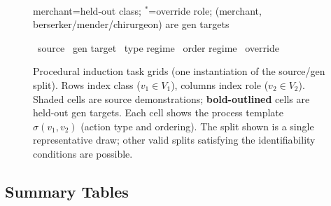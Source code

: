 \documentclass[11pt]{article}
\begin{document}
\begin{figure}[htb]
\begin{minipage}[t]{0.47\textwidth}
\\[4pt]
{\scriptsize merchant=held-out class;\; $^*$=override role;\; (merchant,\,berserker/mender/chirurgeon) are gen targets}
\end{minipage}

\vspace{6pt}
{\scriptsize
\colorbox{gray!22}{\phantom{i}}~source\quad
\fbox{\phantom{i}}~gen target\quad
\colorbox{blue!18}{\phantom{i}}~type regime\quad
\colorbox{green!20}{\phantom{i}}~order regime\quad
\colorbox{red!14}{\phantom{i}}~override
}

\caption{Procedural induction task grids (one instantiation of the source/gen split).
Rows index class ($v_1 \in V_1$), columns index role ($v_2 \in V_2$).
Shaded cells are source demonstrations; \textbf{bold-outlined} cells are held-out gen targets.
Each cell shows the process template $\sigma(v_1,v_2)$ (action type and ordering).
The split shown is a single representative draw; other valid splits satisfying the identifiability conditions are possible.}
\label{fig:proc_grids}
\end{figure}

\subsection{Summary Tables}
\end{document}
